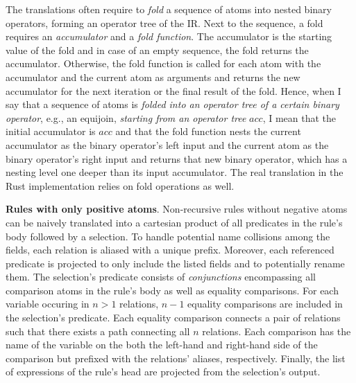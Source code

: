 The translations often require to \emph{fold} a sequence of atoms into
nested binary operators, forming an operator tree of the \ac{IR}.
Next to the sequence, a fold requires an \emph{accumulator} and a \emph{fold function}.
The accumulator is the starting value of the fold and in case of an empty
sequence, the fold returns the accumulator.
Otherwise, the fold function is called for each atom with the accumulator
and the current atom as arguments and returns the new accumulator for the next
iteration or the final result of the fold.
Hence, when I say that a sequence of atoms is
\emph{folded into an operator tree of a certain binary operator}, e.g., an equijoin,
\emph{starting from an operator tree} \(\mathit{acc}\), I mean that the initial
accumulator is \(\mathit{acc}\) and that the fold function nests the current
accumulator as the binary operator's left input and the current atom as the
binary operator's right input and returns that new binary operator,
which has a nesting level one deeper than its input accumulator.
The real translation in the Rust implementation relies on fold operations as well.

\textbf{Rules with only positive atoms}.
Non-recursive rules without negative atoms can be naively translated
into a cartesian product of all predicates in the rule's body followed by
a selection.
To handle potential name collisions among the fields,
each relation is aliased with a unique prefix.
Moreover, each referenced predicate is projected to only include the listed
fields and to potentially rename them.
The selection's predicate consists of \emph{conjunctions}
encompassing all comparison atoms in the rule's body as well as equality comparisons.
For each variable occuring in \(n > 1\) relations, \(n - 1\) equality comparisons
are included in the selection's predicate.
Each equality comparison connects a pair of relations such that there exists
a path connecting all \(n\) relations.
Each comparison has the name of the variable on the both the left-hand and right-hand
side of the comparison but prefixed with the relations' aliases, respectively.
Finally, the list of expressions of the rule's head are projected from the
selection's output.

